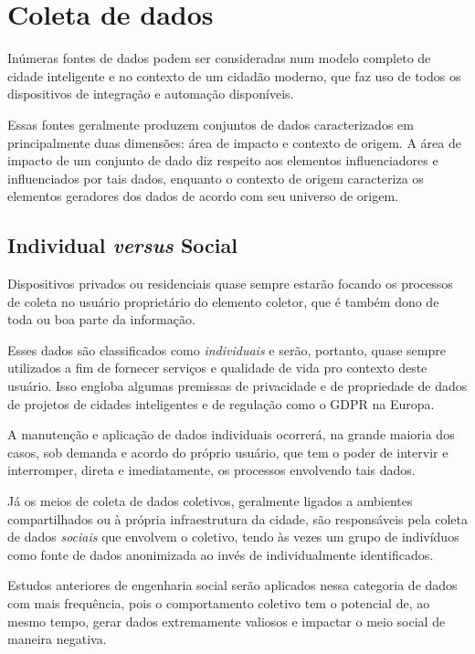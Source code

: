 \chapter{Coleta de dados} \label{c:coleta_de_dados}

Inúmeras fontes de dados podem ser consideradas num modelo completo de cidade inteligente e no contexto de um cidadão moderno, que faz uso de todos os dispositivos de integração e automação disponíveis.

Essas fontes geralmente produzem conjuntos de dados caracterizados em principalmente duas dimensões: área de impacto e contexto de origem. A área de impacto de um conjunto de dado diz respeito aos elementos influenciadores e influenciados por tais dados, enquanto o contexto de origem caracteriza os elementos geradores dos dados de acordo com seu universo de origem.

\section{Individual \textit{versus} Social} \label{s:individual_vs_social}

Dispositivos privados ou residenciais quase sempre estarão focando os processos de coleta no usuário proprietário do elemento coletor, que é também dono de toda ou boa parte da informação.

Esses dados são classificados como \textit{individuais} e serão, portanto, quase sempre utilizados a fim de fornecer serviços e qualidade de vida pro contexto deste usuário. Isso engloba algumas premissas de privacidade e de propriedade de dados de projetos de cidades inteligentes e de regulação como o GDPR \cite{eu:gdpr} na Europa.

A manutenção e aplicação de dados individuais ocorrerá, na grande maioria dos casos, sob demanda e acordo do próprio usuário, que tem o poder de intervir e interromper, direta e imediatamente, os processos envolvendo tais dados.

Já os meios de coleta de dados coletivos, geralmente ligados a ambientes compartilhados ou à própria infraestrutura da cidade, são responsáveis pela coleta de dados \textit{sociais} que envolvem o coletivo, tendo às vezes um grupo de indivíduos como fonte de dados anonimizada ao invés de individualmente identificados.

Estudos anteriores de engenharia social serão aplicados nessa categoria de dados com mais frequência, pois o comportamento coletivo tem o potencial de, ao mesmo tempo, gerar dados extremamente valiosos e impactar o meio social de maneira negativa.

